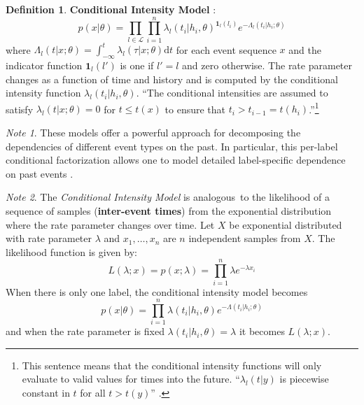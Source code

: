 \documentclass[12pt]{article}
\theoremstyle{plain}
\theoremstyle{definition}
\newtheorem{definition}{Definition}
\theoremstyle{remark}
\newtheorem*{note}{Note}
\begin{document}
\begin{definition}
  \textbf{Conditional Intensity Model} \citep{did08,dalver09}:
\begin{equation*}
  p(x|\theta) = \prod_{l \in \mathcal{L}} \prod_{i=1}^{n}
  \lambda_l(t_i|h_i,\theta)^{\mathbf{1}_l(l_i)}
  e^{-\Lambda_l(t_i|h_i;\theta)}
\end{equation*}
where
$\Lambda_l(t|x;\theta) = \int_{-\infty}^t\lambda_l(\tau|x;\theta)\mathrm{d}t$
for each event sequence $x$ and the indicator function $\mathbf{1}_l(l')$ is one
if $l'=l$ and zero otherwise.
The rate parameter changes as a function of time and history and is computed by
the conditional intensity function $\lambda_l(t_i|h_i,\theta)$.
``The conditional intensities are assumed to satisfy $\lambda_l(t|x;\theta) = 0$
for $t \leq t(x)$ to ensure that $t_i > t_{i-1}=t(h_i)$.''\footnote{This
  sentence means that the conditional intensity functions will only evaluate
  to valid values for times into the future. ``$\lambda_l(t|y)$ is piecewise
  constant in $t$ for all $t > t(y)$'' \citep{pargunmee12}.}
\end{definition}

\begin{note}
  These models offer a powerful approach for decomposing the dependencies of
  different event types on the past.
  In particular, this per-label conditional factorization allows one to model
  detailed label-specific dependence on past events \citep{gunmeexu11}.
\end{note}

\begin{note}
  The \emph{Conditional Intensity Model} is analogous\footnotemark\ to the
  likelihood of a sequence of samples (\textbf{inter-event times}) from the
  exponential distribution where the rate parameter changes over time.
  Let $X$ be exponential distributed with rate parameter $\lambda$ and
  $x_1,\dots,x_n$ are $n$ independent samples from $X$.
  The likelihood function is given by:
  \begin{equation*}
    L(\lambda;x) = p(x;\lambda) = \prod_{i=1}^n\lambda e^{-\lambda x_i}
  \end{equation*}
  When there is only one label, the conditional intensity model becomes
  \begin{equation*}
    p(x|\theta) = \prod_{i=1}^n\lambda(t_i|h_i,\theta)
    e^{-\Lambda(t_i|h_i;\theta)}
  \end{equation*}
  and when the rate parameter is fixed $\lambda(t_i|h_i,\theta) = \lambda$ it
  becomes $L(\lambda;x)$.
\end{note}
\end{document}

